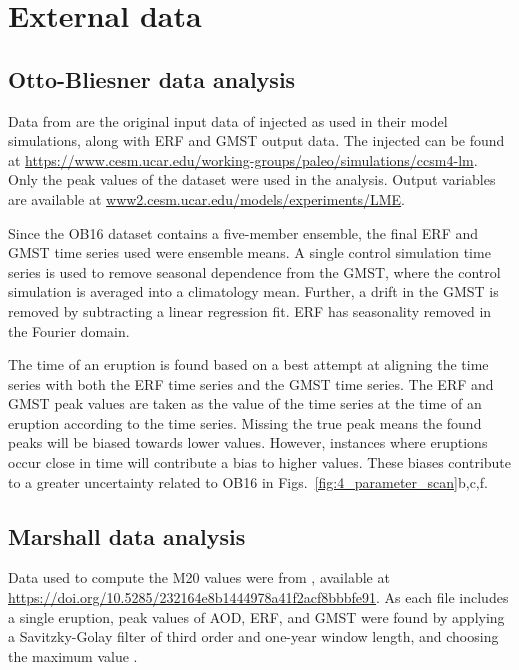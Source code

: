 \documentclass[draft]{agujournal2019}
\begin{document}
  \section{External data}

  \subsection{Otto-Bliesner data analysis}

  \label{ap:ob16}

  Data from  are the original input data of injected  as
  used in their model simulations, along with ERF and GMST output data. The injected
   can be found at
  \url{https://www.cesm.ucar.edu/working-groups/paleo/simulations/ccsm4-lm}. Only the
  peak values of the  dataset were used in the analysis. Output variables are
  available at \url{www2.cesm.ucar.edu/models/experiments/LME}.

  Since the OB16 dataset contains a five-member ensemble, the final ERF and GMST time
  series used were ensemble means. A single control simulation time series is used to
  remove seasonal dependence from the GMST, where the control simulation is averaged
  into a climatology mean. Further, a drift in the GMST is removed by subtracting a
  linear regression fit. ERF has seasonality removed in the Fourier domain.

  The time of an eruption is found based on a best attempt at aligning the  time
  series with both the ERF time series and the GMST time series. The ERF and GMST peak
  values are taken as the value of the time series at the time of an eruption according
  to the  time series. Missing the true peak means the found peaks will be
  biased towards lower values. However, instances where eruptions occur close in time
  will contribute a bias to higher values. These biases contribute to a greater
  uncertainty related to OB16 in Figs.~\ref{fig:4_parameter_scan}b,c,f.

  \subsection{Marshall data analysis}

  \label{ap:m20}

  Data used to compute the M20 values were from , available
  at \url{https://doi.org/10.5285/232164e8b1444978a41f2acf8bbbfe91}. As each file
  includes a single eruption, peak values of AOD, ERF, and GMST were found by applying a
  Savitzky-Golay filter of third order and one-year window length, and choosing the
  maximum value \cite{savitzky1964}.
\end{document}

